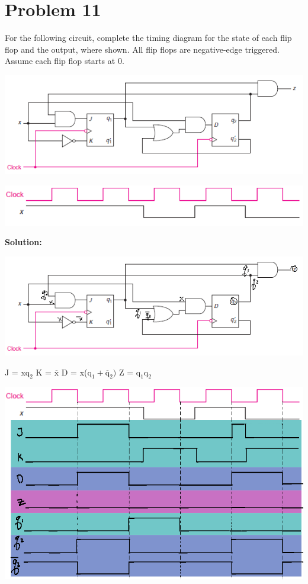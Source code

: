 \documentclass{article}
\begin{document}

    \section*{Problem 11}

    For the following circuit, complete the timing diagram for the state of each flip flop 
    and the output, where shown. All flip flops are negative-edge triggered. Assume each 
    flip flop starts at 0.

    \begin{center}
        \includegraphics[width=\linewidth]{HW4_q11.1.png}
    \end{center}

    \begin{center}
        \includegraphics[width=\linewidth]{HW4_q11.2.png}
    \end{center}

    \textbf{Solution:}

    \begin{center}
        \includegraphics[width=\linewidth]{HW4_q11.1.1.png}
    \end{center}

    J = x$\text{q}_2$
    \quad\quad
    K = $\overline{\text{x}}$
    \quad\quad
    D = x($\text{q}_1+\overline{\text{q}}_2)$
    \quad\quad
    Z = $\text{q}_1\text{q}_2$

    \begin{center}
        \includegraphics[width=\linewidth]{HW4_q11.2.1.png}
    \end{center}
\end{document}
